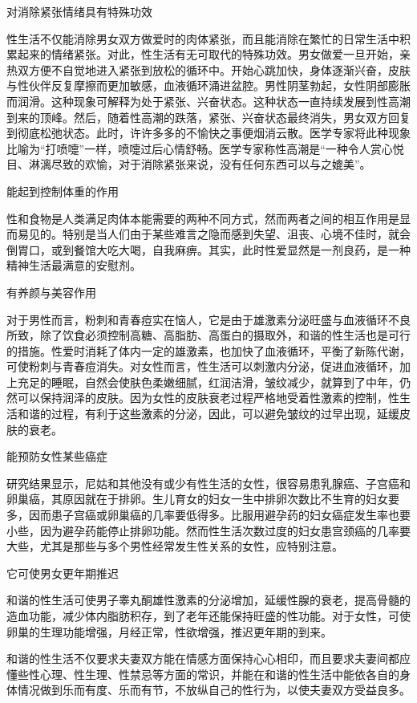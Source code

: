 \documentclass[12pt,UTF8]{ctexbook}
\begin{document}
对消除紧张情绪具有特殊功效

性生活不仅能消除男女双方做爱时的肉体紧张，而且能消除在繁忙的日常生活中积累起来的情绪紧张。对此，性生活有无可取代的特殊功效。男女做爱一旦开始，亲热双方便不自觉地进入紧张到放松的循环中。开始心跳加快，身体逐渐兴奋，皮肤与性伙伴反复摩擦而更加敏感，血液循环涌进盆腔。男性阴茎勃起，女性阴部膨胀而润滑。这种现象可解释为处于紧张、兴奋状态。这种状态一直持续发展到性高潮到来的顶峰。然后，随着性高潮的跌落，紧张、兴奋状态最终消失，男女双方回复到彻底松弛状态。此时，许许多多的不愉快之事便烟消云散。医学专家将此种现象比喻为“打喷嚏”一样，喷嚏过后心情舒畅。医学专家称性高潮是“一种令人赏心悦目、淋漓尽致的欢愉，对于消除紧张来说，没有任何东西可以与之媲美”。

能起到控制体重的作用

性和食物是人类满足肉体本能需要的两种不同方式，然而两者之间的相互作用是显而易见的。特别是当人们由于某些难言之隐而感到失望、沮丧、心境不佳时，就会倒胃口，或到餐馆大吃大喝，自我麻痹。其实，此时性爱显然是一剂良药，是一种精神生活最满意的安慰剂。

有养颜与美容作用

对于男性而言，粉刺和青春痘实在恼人，它是由于雄激素分泌旺盛与血液循环不良所致，除了饮食必须控制高糖、高脂肪、高蛋白的摄取外，和谐的性生活也是可行的措施。性爱时消耗了体内一定的雄激素，也加快了血液循环，平衡了新陈代谢，可使粉刺与青春痘消失。对女性而言，性生活可以刺激内分泌，促进血液循环，加上充足的睡眠，自然会使肤色柔嫩细腻，红润洁滑，皱纹减少，就算到了中年，仍然可以保持润泽的皮肤。因为女性的皮肤衰老过程严格地受着性激素的控制，性生活和谐的过程，有利于这些激素的分泌，因此，可以避免皱纹的过早出现，延缓皮肤的衰老。

能预防女性某些癌症

研究结果显示，尼姑和其他没有或少有性生活的女性，很容易患乳腺癌、子宫癌和卵巢癌，其原因就在于排卵。生儿育女的妇女一生中排卵次数比不生育的妇女要多，因而患子宫癌或卵巢癌的几率要低得多。比服用避孕药的妇女癌症发生率也要小些，因为避孕药能停止排卵功能。然而性生活次数过度的妇女患宫颈癌的几率要大些，尤其是那些与多个男性经常发生性关系的女性，应特别注意。

它可使男女更年期推迟

和谐的性生活可使男子睾丸酮雄性激素的分泌增加，延缓性腺的衰老，提高骨髓的造血功能，减少体内脂肪积存，到了老年还能保持旺盛的性功能。对于女性，可使卵巢的生理功能增强，月经正常，性欲增强，推迟更年期的到来。

和谐的性生活不仅要求夫妻双方能在情感方面保持心心相印，而且要求夫妻间都应懂些性心理、性生理、性禁忌等方面的常识，并能在和谐的性生活中能依各自的身体情况做到乐而有度、乐而有节，不放纵自己的性行为，以使夫妻双方受益良多。
\end{document}
